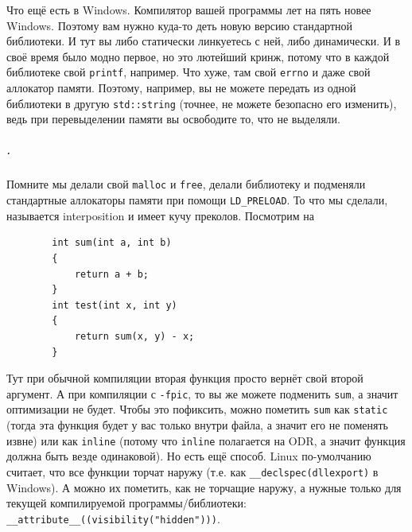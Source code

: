 \documentclass{article}
\begin{document}
    Что ещё есть в Windows. Компилятор вашей программы лет на пять новее Windows. Поэтому вам нужно куда-то деть новую версию стандартной библиотеки. И тут вы либо статически линкуетесь с ней, либо динамически. И в своё время было модно первое, но это лютейший кринж, потому что в каждой библиотеке свой \texttt{printf}, например. Что хуже, там свой \texttt{errno} и даже свой аллокатор памяти. Поэтому, например, вы не можете передать из одной библиотеки в другую \texttt{std::string} (точнее, не можете безопасно его изменить), ведь при перевыделении памяти вы освободите то, что не выделяли.
    \subparagraph{.}
    Помните мы делали свой \texttt{malloc} и \texttt{free}, делали библиотеку и подменяли стандартные аллокаторы памяти при помощи \texttt{LD_PRELOAD}. То что мы сделали, называется interposition и имеет кучу преколов. Посмотрим на
    \begin{verbatim}
        int sum(int a, int b)
        {
            return a + b;
        }
        int test(int x, int y)
        {
            return sum(x, y) - x;
        }
    \end{verbatim}
    Тут при обычной компиляции вторая функция просто вернёт свой второй аргумент. А при компиляции с \texttt{-fpic}, то вы же можете подменить \texttt{sum}, а значит оптимизации не будет. Чтобы это пофиксить, можно пометить \texttt{sum} как \texttt{static} (тогда эта функция будет у вас только внутри файла, а значит его не поменять извне) или как \texttt{inline} (потому что \texttt{inline} полагается на ODR, а значит функция должна быть везде одинаковой). Но есть ещё способ. Linux по-умолчанию считает, что все функции торчат наружу (т.е. как \texttt{__declspec(dllexport)} в Windows). А можно их пометить, как не торчащие наружу, а нужные только для текущей компилируемой программы/библиотеки: \texttt{__attribute__((visibility("hidden")))}.\\
\end{document}
